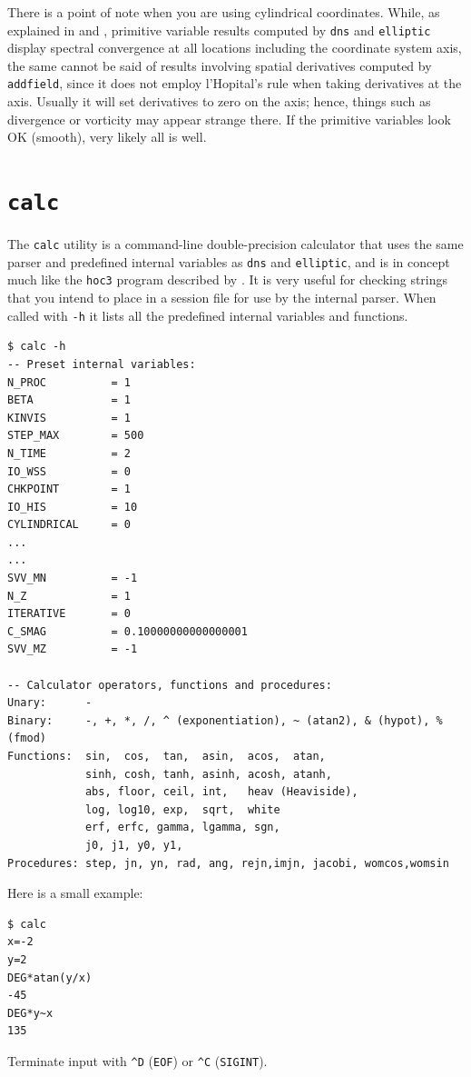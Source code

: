 \documentclass[11pt]{report}
\begin{document}
There is a point of note when you are using cylindrical coordinates.
While, as explained in \citet{blsh04} and \citet{blas19}, primitive
variable results computed by \verb+dns+ and \verb+elliptic+ display
spectral convergence at all locations including the coordinate system
axis, the same cannot be said of results involving spatial derivatives
computed by \verb+addfield+, since it does not employ l'Hopital's rule
when taking derivatives at the axis.  Usually it will set derivatives
to zero on the axis; hence, things such as divergence or vorticity may
appear strange there.  If the primitive variables look OK (smooth),
very likely all is well.

\section{\texttt{calc}}
\label{sec.calc}

The \verb|calc| utility is a command-line double-precision calculator
that uses the same parser and predefined internal variables as
\verb|dns| and \verb|elliptic|, and is in concept much like the
\verb|hoc3| program described by \citet{kernighan84}.  It is very useful for
checking strings that you intend to place in a session file for use by
the internal parser.  When called with \verb|-h| it lists all the
predefined internal variables and functions.

{\small
\begin{verbatim}
$ calc -h
-- Preset internal variables:
N_PROC          = 1
BETA            = 1
KINVIS          = 1
STEP_MAX        = 500
N_TIME          = 2
IO_WSS          = 0
CHKPOINT        = 1
IO_HIS          = 10
CYLINDRICAL     = 0
...
...
SVV_MN          = -1
N_Z             = 1
ITERATIVE       = 0
C_SMAG          = 0.10000000000000001
SVV_MZ          = -1

-- Calculator operators, functions and procedures:
Unary:      -
Binary:     -, +, *, /, ^ (exponentiation), ~ (atan2), & (hypot), % (fmod)
Functions:  sin,  cos,  tan,  asin,  acos,  atan,
            sinh, cosh, tanh, asinh, acosh, atanh,
            abs, floor, ceil, int,   heav (Heaviside),
            log, log10, exp,  sqrt,  white
            erf, erfc, gamma, lgamma, sgn,
            j0, j1, y0, y1,
Procedures: step, jn, yn, rad, ang, rejn,imjn, jacobi, womcos,womsin
\end{verbatim}
}
%
Here is a small example:
{\small
\begin{verbatim}
$ calc
x=-2
y=2
DEG*atan(y/x)
-45
DEG*y~x
135
\end{verbatim}
}
\noindent
Terminate input with \verb|^D| (\verb|EOF|) or \verb|^C| (\verb|SIGINT|).
\end{document}
